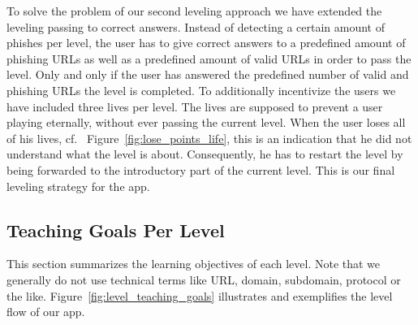 \begin{description}[leftmargin=0cm]
	\item[Leveling Based on Correct Answers] To solve the problem of our second leveling approach we have extended the leveling passing to correct answers.
 Instead of detecting a certain amount of phishes per level, the user has to give correct answers to a predefined amount of phishing URLs as well as a predefined amount of valid URLs in order to pass the level.
 Only and only if the user has answered the predefined number of valid and phishing URLs the level is completed.
 To additionally incentivize the users we have included three lives per level.
 The lives are supposed to prevent a user playing eternally, without ever passing the current level.
 When the user loses all of his lives, cf.
~Figure~\ref{fig:lose_points_life}, this is an indication that he did not understand what the level is about.
 Consequently, he has to restart the level by being forwarded to the introductory part of the current level.
 This is our final leveling strategy for the app.

\end{description}


\subsection{Teaching Goals Per Level}
\label{s:knowledgetransferperlevel}
This section summarizes the learning objectives of each level.
 Note that we generally do not use technical terms like URL, domain, subdomain, protocol or the like. Figure~\ref{fig:level_teaching_goals} illustrates and exemplifies the level flow of our app.


